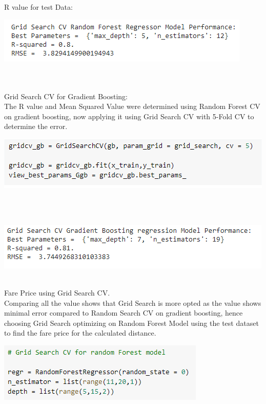 \documentclass[journal,twoside,web]{ieeecolor}
\begin{document}
\\
\\
R value for test Data:
\begin{center}
\includegraphics[scale=0.60]{Picture36.png}
\end{center}
\\
\\
Grid Search CV for Gradient Boosting:
\\
The R value and Mean Squared Value were determined using Random Forest CV on gradient boosting, now applying it using Grid Search CV with 5-Fold CV to determine the error.
\\
\begin{center}
\includegraphics[scale=0.60]{Picture37.png}
\end{center}
\\
\\
\begin{center}
\includegraphics[scale=0.60]{Picture38.png}
\end{center}
\\
Fare Price using Grid Search CV.
\\
Comparing all the value shows that Grid Search is more opted as the value shows minimal error compared to Random Search CV on gradient boosting, hence choosing Grid Search optimizing on Random Forest Model using the test dataset to find the fare price for the calculated distance.
\\
\begin{center}
\includegraphics[scale=0.60]{Picture39.png}
\end{center}
\end{document}
